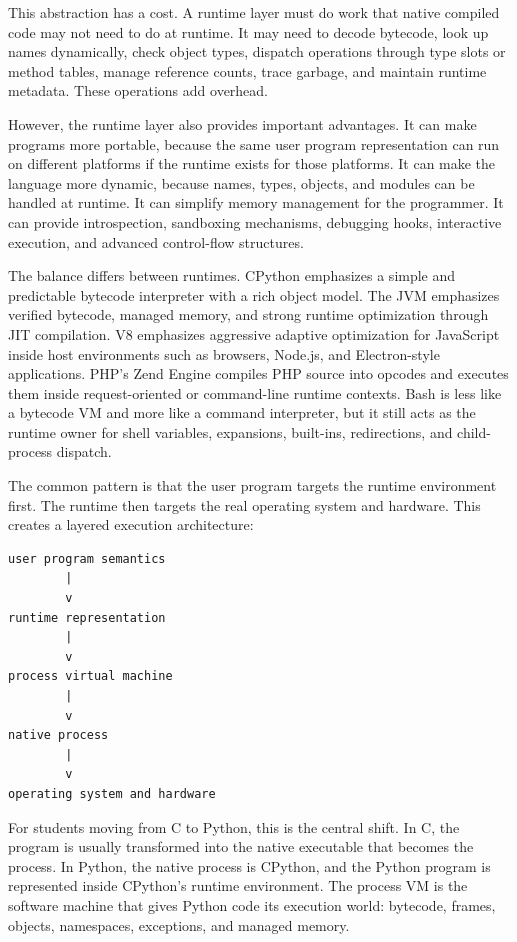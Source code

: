 This abstraction has a cost. A runtime layer must do work that native compiled code may not need to do at runtime. It may need to decode bytecode, look up names dynamically, check object types, dispatch operations through type slots or method tables, manage reference counts, trace garbage, and maintain runtime metadata. These operations add overhead.

However, the runtime layer also provides important advantages. It can make programs more portable, because the same user program representation can run on different platforms if the runtime exists for those platforms. It can make the language more dynamic, because names, types, objects, and modules can be handled at runtime. It can simplify memory management for the programmer. It can provide introspection, sandboxing mechanisms, debugging hooks, interactive execution, and advanced control-flow structures.

The balance differs between runtimes. CPython emphasizes a simple and predictable bytecode interpreter with a rich object model. The JVM emphasizes verified bytecode, managed memory, and strong runtime optimization through JIT compilation. V8 emphasizes aggressive adaptive optimization for JavaScript inside host environments such as browsers, Node.js, and Electron-style applications. PHP's Zend Engine compiles PHP source into opcodes and executes them inside request-oriented or command-line runtime contexts. Bash is less like a bytecode VM and more like a command interpreter, but it still acts as the runtime owner for shell variables, expansions, built-ins, redirections, and child-process dispatch.

The common pattern is that the user program targets the runtime environment first. The runtime then targets the real operating system and hardware. This creates a layered execution architecture:

\begin{verbatim}
user program semantics
        |
        v
runtime representation
        |
        v
process virtual machine
        |
        v
native process
        |
        v
operating system and hardware
\end{verbatim}

For students moving from C to Python, this is the central shift. In C, the program is usually transformed into the native executable that becomes the process. In Python, the native process is CPython, and the Python program is represented inside CPython's runtime environment. The process VM is the software machine that gives Python code its execution world: bytecode, frames, objects, namespaces, exceptions, and managed memory.



